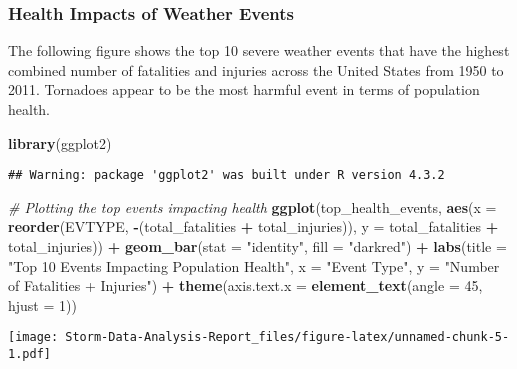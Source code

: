 \documentclass[
]{article}
\newenvironment{Shaded}{\begin{snugshade}}{\end{snugshade}}
\newcommand{\AttributeTok}[1]{\textcolor[rgb]{0.13,0.29,0.53}{#1}}
\newcommand{\CommentTok}[1]{\textcolor[rgb]{0.56,0.35,0.01}{\textit{#1}}}
\newcommand{\DecValTok}[1]{\textcolor[rgb]{0.00,0.00,0.81}{#1}}
\newcommand{\FunctionTok}[1]{\textcolor[rgb]{0.13,0.29,0.53}{\textbf{#1}}}
\newcommand{\NormalTok}[1]{#1}
\newcommand{\SpecialCharTok}[1]{\textcolor[rgb]{0.81,0.36,0.00}{\textbf{#1}}}
\newcommand{\StringTok}[1]{\textcolor[rgb]{0.31,0.60,0.02}{#1}}
\begin{document}
\hypertarget{health-impacts-of-weather-events}{%
\subsubsection{Health Impacts of Weather
Events}\label{health-impacts-of-weather-events}}

The following figure shows the top 10 severe weather events that have
the highest combined number of fatalities and injuries across the United
States from 1950 to 2011. Tornadoes appear to be the most harmful event
in terms of population health.

\begin{Shaded}
\begin{Highlighting}[]
\FunctionTok{library}\NormalTok{(ggplot2)}
\end{Highlighting}
\end{Shaded}

\begin{verbatim}
## Warning: package 'ggplot2' was built under R version 4.3.2
\end{verbatim}

\begin{Shaded}
\begin{Highlighting}[]
\CommentTok{\# Plotting the top events impacting health}
\FunctionTok{ggplot}\NormalTok{(top\_health\_events, }\FunctionTok{aes}\NormalTok{(}\AttributeTok{x =} \FunctionTok{reorder}\NormalTok{(EVTYPE, }\SpecialCharTok{{-}}\NormalTok{(total\_fatalities }\SpecialCharTok{+}\NormalTok{ total\_injuries)), }
                              \AttributeTok{y =}\NormalTok{ total\_fatalities }\SpecialCharTok{+}\NormalTok{ total\_injuries)) }\SpecialCharTok{+}
  \FunctionTok{geom\_bar}\NormalTok{(}\AttributeTok{stat =} \StringTok{"identity"}\NormalTok{, }\AttributeTok{fill =} \StringTok{"darkred"}\NormalTok{) }\SpecialCharTok{+}
  \FunctionTok{labs}\NormalTok{(}\AttributeTok{title =} \StringTok{"Top 10 Events Impacting Population Health"}\NormalTok{, }
       \AttributeTok{x =} \StringTok{"Event Type"}\NormalTok{, }\AttributeTok{y =} \StringTok{"Number of Fatalities + Injuries"}\NormalTok{) }\SpecialCharTok{+}
  \FunctionTok{theme}\NormalTok{(}\AttributeTok{axis.text.x =} \FunctionTok{element\_text}\NormalTok{(}\AttributeTok{angle =} \DecValTok{45}\NormalTok{, }\AttributeTok{hjust =} \DecValTok{1}\NormalTok{))}
\end{Highlighting}
\end{Shaded}

\texttt{[image: Storm-Data-Analysis-Report\_files/figure-latex/unnamed-chunk-5-1.pdf]}
\end{document}

